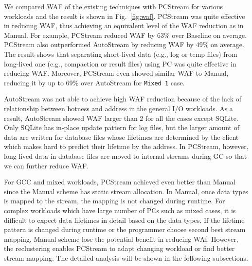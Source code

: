 We compared WAF of the existing techniques with \textsf{\small PCStream} for
various workloads and the result is shown in Fig.~\ref{fig:waf}.
\textsf{\small PCStream} was quite effective in reducing WAF, thus achieving an
equivalent level of the WAF reduction as in \textsf{\small Manual}.  For
example, \textsf{\small PCStream}  reduced WAF by 63\% over \textsf{\small
Baseline} on average.  \textsf{\small PCStream} also outperformed
\textsf{\small AutoStream} by reducing WAF by 49\% on average.  The result
shows that separating short-lived data (e.g., log or temp files) from
long-lived one (e.g., compaction or result files) using PC was quite effective
in reducing WAF.  Moreover, \textsf{\small PCStream} even showed similar WAF to
\textsf{\small Manual}, reducing it by up to 69\% over \textsf{\small
AutoStream} for \texttt{Mixed 1} case.

AutoStream was not able to achieve high WAF reduction because of 
the lack of relationship between hotness and address in the general I/O workloads.
As a result, AutoStream showed WAF larger than 2 for all the cases except SQLite.
Only SQLite has in-place update pattern for log files, but the larger amount of data are
written for database files whose lifetimes are determined by the client
which makes hard to predict their lifetime by the address.
In PCStream, however, long-lived data in database files are moved to internal streams
during GC so that we can further reduce WAF.

For GCC and mixed workloads, PCStream achieved even better than Manual
since the Manual scheme has static stream allocation.
In Manual, once data types is mapped to the stream, the mapping is not changed 
during runtime.
For complex workloads which have large number of PCs such as mixed cases,
it is difficult to expect data lifetimes in detail based on the data types.
If the lifetime pattern is changed during runtime or the programmer choose
second best stream mapping,
Manual scheme lose the potential benefit in reducing WAf.
However, the reclustering enables PCStream to adapt changing workload or find
better stream mapping.
The detailed analysis will be shown in the following subsections.

